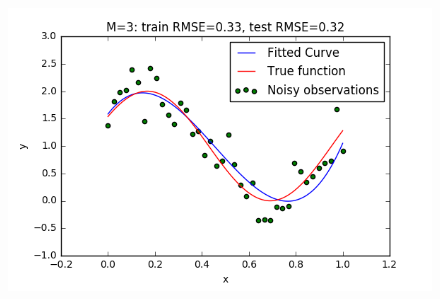 \documentclass[a4paper]{article}
\begin{document}
\begin{figure}[h!]
\begin{multicols}{2}
    \includegraphics[width=\linewidth]{Images/curvefit_m3_n_40.png}\par
\end{multicols}
\end{figure}
\end{document}
